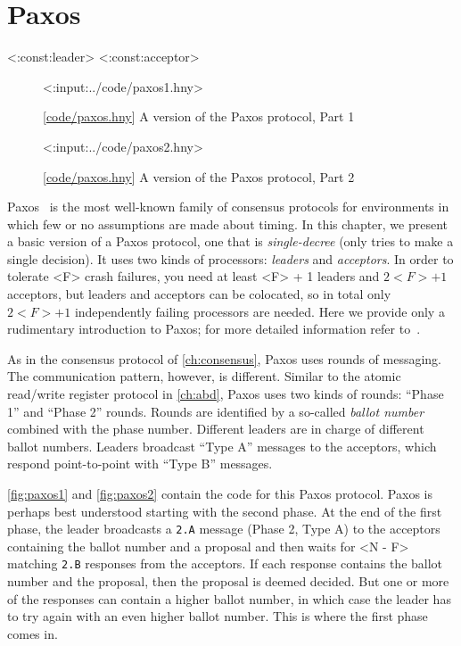 \documentclass{report}
\newcommand{\harmonylink}[1]{%
[\href{https://harmony.cs.cornell.edu/#1}{\underline{#1}}]%
}
\newenvironment{code}{
\tcolorbox
}{
\endtcolorbox
}
\begin{document}
\chapter{Paxos}
\label{ch:paxos}

<{:const:leader}>
<{:const:acceptor}>

\begin{figure}
\begin{code}
<{:input:../code/paxos1.hny}>
\end{code}
\caption{\harmonylink{code/paxos.hny} A version of the Paxos protocol, Part 1}
\label{fig:paxos1}
\end{figure}

\begin{figure}
\begin{code}
<{:input:../code/paxos2.hny}>
\end{code}
\caption{\harmonylink{code/paxos.hny} A version of the Paxos protocol, Part 2}
\label{fig:paxos2}
\end{figure}

Paxos~\cite{Paxos} is the most well-known family of consensus protocols for
environments in which few or no assumptions are made about timing.
In this chapter, we present a basic version of a Paxos protocol, one that is
\emph{single-decree} (only tries to make a single decision).
It uses two kinds of processors: \emph{leaders} and \emph{acceptors}.
In order to tolerate <{F}> crash failures, you need at least <{F}> + 1 leaders
and $2<{F}> + 1$ acceptors, but leaders and acceptors can be colocated, so
in total only $2<{F}> + 1$ independently failing processors are needed.
Here we provide only a rudimentary introduction to Paxos; for more detailed
information refer to~\cite{Paxos}.

As in the consensus protocol of \autoref{ch:consensus}, Paxos uses rounds of messaging.
The communication pattern, however, is different.
Similar to the atomic read/write register protocol in \autoref{ch:abd},
Paxos uses two kinds of rounds: ``Phase 1'' and ``Phase 2'' rounds.
Rounds are identified by a so-called
\emph{ballot number} combined with the phase number.
Different leaders are in charge of different ballot numbers.
Leaders broadcast ``Type A''
messages to the acceptors, which respond point-to-point with ``Type B''
messages.

\autoref{fig:paxos1} and \autoref{fig:paxos2} contain the code for
this Paxos protocol.  Paxos is perhaps best understood starting
with the second phase.  At the end of the first phase, the leader
broadcasts a \texttt{2.A} message (Phase 2, Type A) to the acceptors
containing the ballot number and a proposal and then waits for
<{N - F}> matching \texttt{2.B} responses from the
acceptors.  If each response contains the ballot number and the
proposal, then the proposal is deemed decided.  But one or more of
the responses can contain a higher ballot number, in which case the
leader has to try again with an even higher ballot number.  This is
where the first phase comes in.
\end{document}
